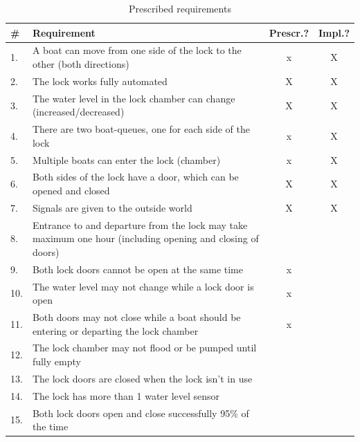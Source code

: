 \documentclass{article}
\begin{document}
    \begin{table}[h]
            \centering
            \begin{tabular}{|p{0.3cm}|p{7cm}|c|c|}
                \hline
                \textbf{\#} & \textbf{Requirement} & \textbf{Prescr.?} & \textbf{Impl.?} \\
                \hline
                1. & A boat can move from one side of the lock to the other (both directions) & x & X \\
                \hline
                2. & The lock works fully automated & X & X \\
                \hline
                3. & The water level in the lock chamber can change (increased/decreased) & X & X \\
                \hline
                4. & There are two boat-queues, one for each side of the lock & x & X\\
                \hline
                5. & Multiple boats can enter the lock (chamber) & x & X\\
                \hline
                6. & Both sides of the lock have a door, which can be opened and closed & X & X \\
                \hline
                7. & Signals are given to the outside world & X & X \\
                \hline
                8. & Entrance to and departure from the lock may take maximum one hour (including opening and closing of doors) & & \\
                \hline \hline
                9. & Both lock doors cannot be open at the same time  & x & \\
                \hline
                10. & The water level may not change while a lock door is open  & x &\\
                \hline
                11. & Both doors may not close while a boat should be entering or departing the lock chamber & x &\\
                \hline
                12. & The lock chamber may not flood or be pumped until fully empty & & \\
                \hline
                13. & The lock doors are closed when the lock isn't in use & & \\
                \hline\hline
                14. & The lock has more than 1 water level sensor & & \\ 
                \hline
                15. & Both lock doors open and close successfully 95\% of the time & & \\
                \hline
            \end{tabular}
            \caption{Prescribed requirements}
            
            \label{tab:presc_impl_req}
        \end{table}



\end{document}
